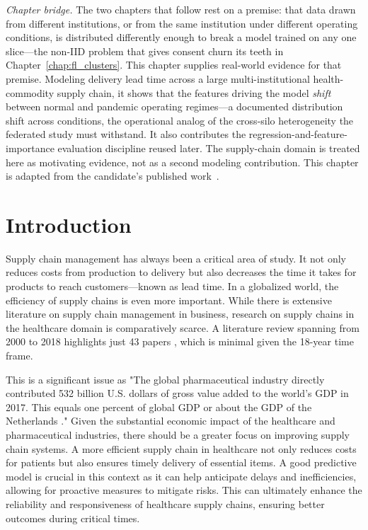 \documentclass[12pt]{report}
\begin{document}
\noindent\emph{Chapter bridge.} The two chapters that follow rest on a premise:
that data drawn from different institutions, or from the same institution under
different operating conditions, is distributed differently enough to break a model
trained on any one slice---the non-IID problem that gives consent churn its
teeth in Chapter~\ref{chap:fl_clusters}. This chapter supplies real-world evidence
for that premise. Modeling delivery lead time across a large multi-institutional
health-commodity supply chain, it shows that the features driving the model
\emph{shift} between normal and pandemic operating regimes---a documented
distribution shift across conditions, the operational analog of the cross-silo
heterogeneity the federated study must withstand. It also contributes the
regression-and-feature-importance evaluation discipline reused later. The
supply-chain domain is treated here as motivating evidence, not as a second
modeling contribution. This chapter is adapted from the candidate's published
work~\cite{nhan2024optimizing}.

\section{Introduction}
\label{sec:introduction}

Supply chain management has always been a critical area of study. It not only reduces costs from production to delivery but also decreases the time it takes for products to reach customers—known as lead time. In a globalized world, the efficiency of supply chains is even more important. While there is extensive literature on supply chain management in business, research on supply chains in the healthcare domain is comparatively scarce. A literature review spanning from 2000 to 2018 highlights just 43 papers \cite{beldek2020supply}, which is minimal given the 18-year time frame.

This is a significant issue as "The global pharmaceutical industry directly contributed 532 billion U.S. dollars of gross value added to the world’s GDP in 2017. This equals one percent of global GDP or about the GDP of the Netherlands \cite{wifor2020}." Given the substantial economic impact of the healthcare and pharmaceutical industries, there should be a greater focus on improving supply chain systems. A more efficient supply chain in healthcare not only reduces costs for patients but also ensures timely delivery of essential items. A good predictive model is crucial in this context as it can help anticipate delays and inefficiencies, allowing for proactive measures to mitigate risks. This can ultimately enhance the reliability and responsiveness of healthcare supply chains, ensuring better outcomes during critical times.
\end{document}
